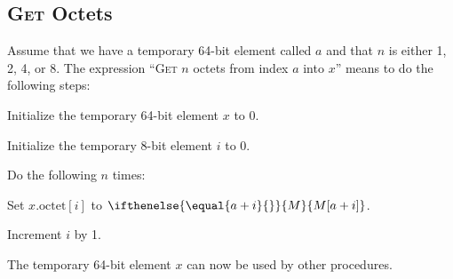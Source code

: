 \documentclass[a4paper,12pt]{article}
\newcommand{\MEM}[1]{\ifthenelse{\equal{#1}{}}{M}{M[#1]}}
\newcommand{\octno}[2]{#1.\mathrm{octet}[#2]}
\newcommand{\proc}[1]{\textsc{#1}}
\theoremstyle{definition}
\begin{document}
\subsection{\proc{Get} Octets}

Assume that we have a temporary 64-bit element called $a$ and that $n$ is either 1, 2, 4, or 8.
The expression ``\proc{Get} $n$ octets from index $a$ into $x$'' means to do the following steps:
\begin{stepnumbers}
\item Initialize the temporary 64-bit element $x$ to 0.
\item Initialize the temporary 8-bit element $i$ to 0.
\item Do the following $n$ times:
  \begin{stepletters}
  \item Set $\octno{x}{i}$ to $\MEM{a+i}$.
  \item Increment $i$ by 1.
  \end{stepletters}
\end{stepnumbers}
The temporary 64-bit element $x$ can now be used by other procedures.
\end{document}
